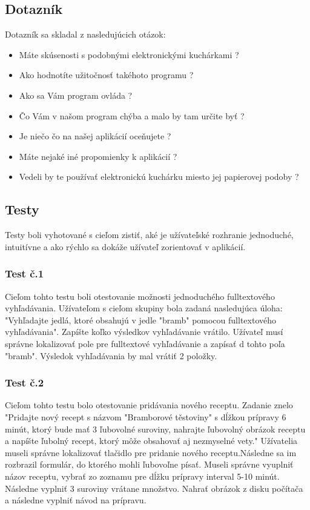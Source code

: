 \documentclass[12pt,a4paper,titlepage,final]{article}
\begin{document}
\subsection{Dotazník}
Dotazník sa skladal z nasledujúcich otázok:
\begin{itemize}
\item Máte skúsenosti s podobnými elektronickými kuchárkami ?
\item Ako hodnotíte užitočnosť takéhoto programu ?
\item Ako sa Vám program ovláda ?
\item Čo Vám v našom program chýba a malo by tam určite byť ?
\item Je niečo čo na našej aplikácií oceňujete ?
\item Máte nejaké iné propomienky k aplikácií ?
\item Vedeli by te používať elektronickú kuchárku miesto jej papierovej podoby ?

\end{itemize}

\subsection{Testy}
Testy boli vyhotované s cieľom zistiť, aké je užívateľské rozhranie jednoduché, intuitívne a ako rýchlo sa dokáže užívateľ zorientovať v aplikácií. 

\subsubsection{Test č.1}
Cieľom tohto testu boli otestovanie možnosti jednoduchého fulltextového vyhľadávania. Užívateľom s cieľom skupiny bola zadaná nasledujúca úloha: "Vyhľadajte jedlá, ktoré obsahujú v jedle "bramb" pomocou fulltextového vyhľadávania". Zapíšte koľko výsledkov vyhľadávanie vrátilo. Užívateľ musí správne lokalizovať pole pre fulltextové vyhľadávanie a zapísať d tohto poľa "bramb". Výsledok vyhľadávania by mal vrátiť 2 položky.

\subsubsection{Test č.2}
Cieľom tohto testu bolo otestovanie pridávania nového receptu. Zadanie znelo "Pridajte nový recept s názvom "Bramborové těstoviny" s dĺžkou prípravy 6 minút, ktorý bude mať 3 ľubovolné suroviny, nahrajte ľubovolný obrázok receptu a napíšte ľubolný recept, ktorý môže obsahovať aj nezmyselné vety." Užívatelia museli správne lokalizovať tlačidlo pre pridanie nového receptu.Následne sa im rozbrazil formulár, do ktorého mohli ľubovoľne písať. Museli správne vyuplniť názov receptu, vybrať zo zoznamu pre dĺžku prípravy interval 5-10 minút. Následne vyplniť 3 suroviny vrátane množstvo. Nahrať obrázok z disku počítača a následne vyplniť návod na prípravu.
\end{document}
